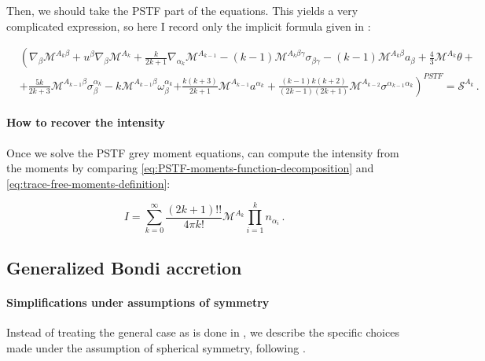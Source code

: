 \documentclass[main.tex]{subfiles}
\begin{document}
Then, we should take the PSTF part of the equations. This yields a very complicated expression, so here I record only the implicit formula given in \textcite[eq. 4.11c]{Thorne:1981feb}:

\begin{equation} \label{eq:PSTF-grey-moment-equations}
  \begin{split}
    &\left( \nabla _\beta \mathscr M ^{A_k \beta} + u^\beta \nabla_\beta \mathscr M ^{A_k}
    + \frac{k}{2k+1} \nabla_{\alpha_k} \mathscr M ^{A_{k-1}}
    - (k-1) \mathscr M ^{A_k \beta \gamma} \sigma_{\beta \gamma} \right.
    - (k-1) \mathscr M ^{A_k \beta} a_\beta
    + \frac{4}{3} \mathscr M ^{A_k} \theta + \\
    &+ \frac{5k}{2k+3} \mathscr M ^{A_{k-1} \beta} \sigma_\beta^{\alpha_k}
    - k \mathscr M ^{A_{k-1} \beta} \omega_\beta ^{\alpha_k}
    \left.+ \frac{k (k+3)}{2k+1} \mathscr M ^{A_{k-1}} a^{\alpha_k}
    + \frac{(k-1) k (k+2) }{(2k-1) (2k+1)} \mathscr M ^{A_{k-2}} \sigma^{\alpha_{k-1} \alpha_k} \right)^{PSTF} = \mathscr S ^{A_k} \,.
  \end{split}
\end{equation}

\paragraph{How to recover the intensity}

Once we solve the PSTF grey moment equations, can compute the intensity from the moments by comparing \eqref{eq:PSTF-moments-function-decomposition} and \eqref{eq:trace-free-moments-definition}:

\begin{equation}
  I = \sum _{k=0}   ^{\infty} \frac{(2k+1)!!}{4 \pi k!} \mathscr M^{A_k} \prod_{i=1}^k n_{\alpha_i}\,.
\end{equation}

\subsection{Generalized Bondi accretion}

\paragraph{Simplifications under assumptions of symmetry}

Instead of treating the general case as is done in \cite[]{Thorne:1981feb}, we describe the specific choices made under the assumption of spherical symmetry, following \textcite[]{ThorneFLammmangZytkow:1981feb}.
\end{document}
